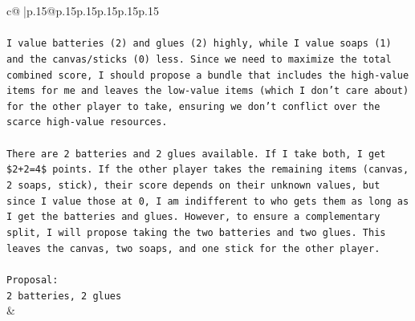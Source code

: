 \documentclass{article}
\begin{document}
{\begin{supertabular}{c@{$\;$}|p{.15\linewidth}@{}p{.15\linewidth}p{.15\linewidth}p{.15\linewidth}p{.15\linewidth}p{.15\linewidth}}
{{{\\ 
\\ 
\texttt{I value batteries (2) and glues (2) highly, while I value soaps (1) and the canvas/sticks (0) less. Since we need to maximize the total combined score, I should propose a bundle that includes the high{-}value items for me and leaves the low{-}value items (which I don't care about) for the other player to take, ensuring we don't conflict over the scarce high{-}value resources.} \\
\\ 
\texttt{There are 2 batteries and 2 glues available. If I take both, I get \$2+2=4\$ points. If the other player takes the remaining items (canvas, 2 soaps, stick), their score depends on their unknown values, but since I value those at 0, I am indifferent to who gets them as long as I get the batteries and glues. However, to ensure a complementary split, I will propose taking the two batteries and two glues. This leaves the canvas, two soaps, and one stick for the other player.} \\
\\ 
\texttt{Proposal:} \\
\texttt{2 batteries, 2 glues} \\
            }
        }
    }
    & \\ \\


\end{supertabular}}
\end{document}
